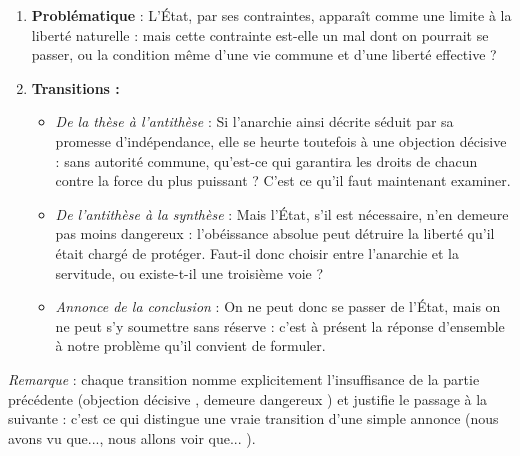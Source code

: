 \documentclass[11pt]{article}
\begin{document}
\begin{corrige}
\begin{enumerate}
\item \textbf{Problématique} : \guillemotleft L'État, par ses contraintes, apparaît comme une limite à la liberté naturelle : mais cette contrainte est-elle un mal dont on pourrait se passer, ou la condition même d'une vie commune et d'une liberté effective ? \guillemotright
\item \textbf{Transitions :}
\begin{itemize}
\item \emph{De la thèse à l'antithèse} : \guillemotleft Si l'anarchie ainsi décrite séduit par sa promesse d'indépendance, elle se heurte toutefois à une objection décisive : sans autorité commune, qu'est-ce qui garantira les droits de chacun contre la force du plus puissant ? C'est ce qu'il faut maintenant examiner. \guillemotright
\item \emph{De l'antithèse à la synthèse} : \guillemotleft Mais l'État, s'il est nécessaire, n'en demeure pas moins dangereux : l'obéissance absolue peut détruire la liberté qu'il était chargé de protéger. Faut-il donc choisir entre l'anarchie et la servitude, ou existe-t-il une troisième voie ? \guillemotright
\item \emph{Annonce de la conclusion} : \guillemotleft On ne peut donc se passer de l'État, mais on ne peut s'y soumettre sans réserve : c'est à présent la réponse d'ensemble à notre problème qu'il convient de formuler. \guillemotright
\end{itemize}
\end{enumerate}
\emph{Remarque} : chaque transition nomme explicitement l'insuffisance de la partie précédente (\guillemotleft objection décisive \guillemotright, \guillemotleft demeure dangereux \guillemotright) et justifie le passage à la suivante : c'est ce qui distingue une vraie transition d'une simple annonce (\guillemotleft nous avons vu que..., nous allons voir que... \guillemotright).
\end{corrige}
\end{document}
